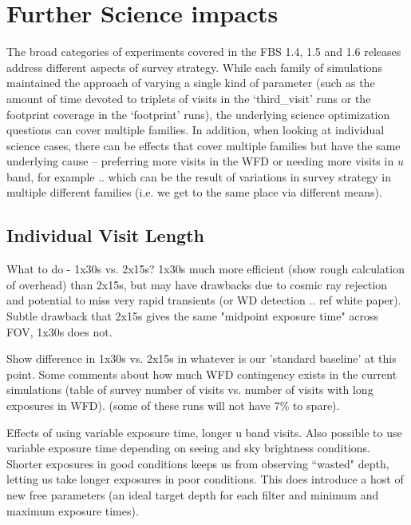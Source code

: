 \section{Further Science impacts}

The broad categories of experiments covered in the FBS 1.4, 1.5 and 1.6 releases address different aspects of survey strategy. While each family of simulations maintained the approach of varying a single kind of parameter (such as the amount of time devoted to triplets of visits in the `third\_visit' runs or the footprint coverage in the `footprint' runs), the underlying science optimization questions can cover multiple families. In addition, when looking at individual science cases, there can be effects that cover multiple families but have the same underlying cause -- preferring more visits in the WFD or needing more visits in $u$ band, for example .. which can be the result of variations in survey strategy in multiple different families (i.e. we get to the same place via different means).

\subsection{Individual Visit Length}
What to do - 1x30s vs. 2x15s? 1x30s much more efficient (show rough calculation of overhead) than 2x15s, but may have drawbacks due to cosmic ray rejection and potential to miss very rapid transients (or WD detection .. ref white paper). Subtle drawback that 2x15s gives the same "midpoint exposure time" across FOV, 1x30s does not. 

Show difference in 1x30s vs. 2x15s in whatever is our 'standard baseline' at this point. 
Some comments about how much WFD contingency exists in the current simulations (table of survey number of visits vs. number of visits with long exposures in WFD).
(some of these runs will not have 7\% to spare).

Effects of using variable exposure time, longer u band visits. 
Also possible to use variable exposure time depending on seeing and sky brightness conditions. Shorter exposures in good conditions keeps us from observing ``wasted" depth, letting us take longer exposures in poor conditions. This does introduce a host of new free parameters (an ideal target depth for each filter and minimum and maximum exposure times). 

